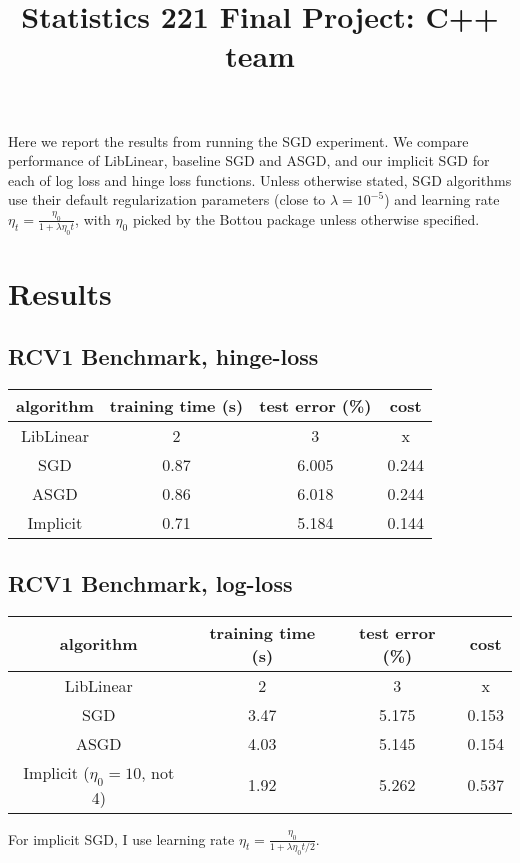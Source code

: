\documentclass{article}
\title{Statistics 221 Final Project: C++ team}
\begin{document}
\maketitle

Here we report the results from running the SGD experiment. We compare performance of LibLinear, baseline SGD and ASGD, and our implicit SGD for each of log loss and hinge loss functions. Unless otherwise stated, SGD algorithms use their default regularization parameters (close to $\lambda = 10^{-5}$) and learning rate $\eta_t = \frac{\eta_0}{1+ \lambda\eta_0 t}$, with $\eta_0$ picked by the Bottou package unless otherwise specified.

\section{Results}

\subsection{RCV1 Benchmark, hinge-loss}
\begin{center}
\begin{tabular}{ c | c | c | c }
  algorithm & training time (s) & test error (\%) & cost \\ \hline                       
  LibLinear & 2 & 3 & x\\
  SGD & 0.87 &  6.005 & 0.244\\
  ASGD & 0.86 & 6.018 & 0.244\\
  Implicit & 0.71 & 5.184 & 0.144\\
\end{tabular}
\end{center}

\subsection{RCV1 Benchmark, log-loss}
\begin{center}
\begin{tabular}{ c | c | c | c }
  algorithm & training time (s) & test error (\%) & cost \\ \hline                       
  LibLinear & 2 & 3 & x\\
  SGD & 3.47 &  5.175 & 0.153\\
  ASGD & 4.03 & 5.145 & 0.154\\
  Implicit ($\eta_0=10$, not 4) & 1.92 & 5.262 & 0.537\\
\end{tabular}
\end{center}
For implicit SGD, I use learning rate $\eta_t = \frac{\eta_0}{1+ \lambda\eta_0 t/2}$.
\end{document}
